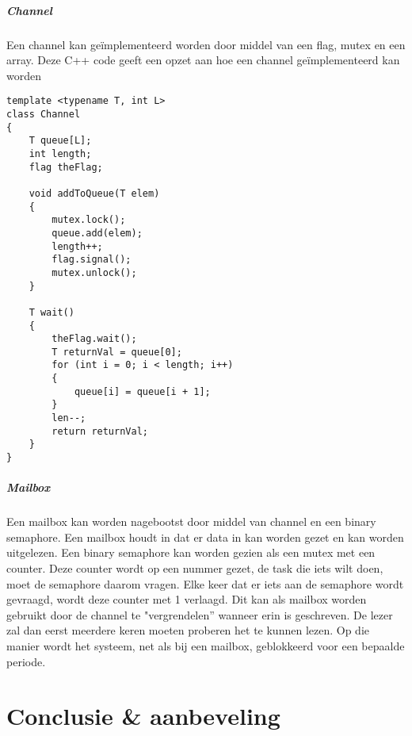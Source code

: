 \documentclass{article}
\begin{document}
\subsubsection{Channel}
Een channel kan ge\"{i}mplementeerd worden door middel van een flag, mutex en een array. Deze C++ code geeft een opzet aan hoe een channel ge\"{i}mplementeerd kan worden
\begin{verbatim}
template <typename T, int L>
class Channel
{
    T queue[L];
    int length;
    flag theFlag;

    void addToQueue(T elem)
    {
        mutex.lock();
        queue.add(elem);
        length++;
        flag.signal();
        mutex.unlock();
    }

    T wait()
    {
        theFlag.wait();
        T returnVal = queue[0];
        for (int i = 0; i < length; i++)
        {
            queue[i] = queue[i + 1];
        }
        len--;
        return returnVal;
    }
}
\end{verbatim}

\subsubsection{Mailbox}
Een mailbox kan worden nagebootst door middel van channel en een binary semaphore. Een mailbox houdt in dat er data in kan worden gezet en kan worden uitgelezen. Een binary semaphore kan worden gezien als een mutex met een counter. Deze counter wordt op een nummer gezet, de task die iets wilt doen, moet de semaphore daarom vragen. Elke keer dat er iets aan de semaphore wordt gevraagd, wordt deze counter met 1 verlaagd. Dit kan als mailbox worden gebruikt door de channel te "vergrendelen” wanneer erin is geschreven. De lezer zal dan eerst meerdere keren moeten proberen het te kunnen lezen. Op die manier wordt het systeem, net als bij een mailbox, geblokkeerd voor een bepaalde periode.

\part{Conclusie \& aanbeveling}
\end{document}

